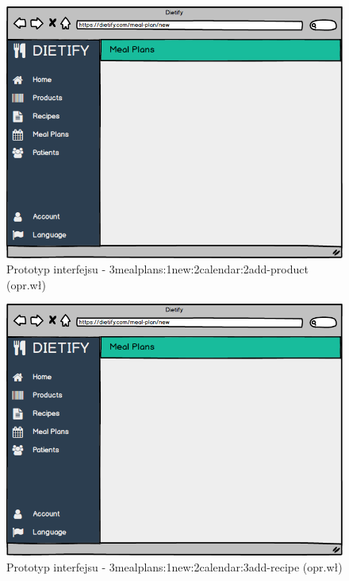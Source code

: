 \begin{minipage}{\textwidth}
    \begin{figure}[H]
        \centering\includegraphics[scale=0.55]{../mockup/3mealplans_1new_2calendar_2add-product.png}
        \caption{Prototyp interfejsu - 3mealplans:1new:2calendar:2add-product (opr.wł)}\label{rysunek:3mealplans_1new_2calendar_2add-product}
    \end{figure}
\end{minipage}
\begin{minipage}{\textwidth}
    \begin{figure}[H]
        \centering\includegraphics[scale=0.55]{../mockup/3mealplans_1new_2calendar_3add-recipe.png}
        \caption{Prototyp interfejsu - 3mealplans:1new:2calendar:3add-recipe (opr.wł)}\label{rysunek:3mealplans_1new_2calendar_3add-recipe}
    \end{figure}
\end{minipage}
